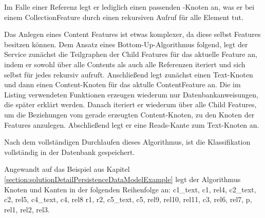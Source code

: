     Im Falle einer Referenz legt er lediglich einen passenden {\resource}-Knoten an,
    was er bei einem CollectionFeature durch einen rekursiven Aufruf für alle Element tut.
    
    Das Anlegen eines Content Features ist etwas komplexer,
    da diese selbst Features besitzen können.
    Dem Ansatz eines Bottom-Up-Algorithmus folgend, legt der Service
    zunächst die Teilgraphen der Child Features für das aktuelle Feature an,
    indem er sowohl über alle Contents als auch alle Referenzen iteriert und
    sich selbst für jedes rekursiv aufruft.
    Anschließend legt zunächst einen Text-Knoten und dann einen Content-Knoten
    für das aktulle ContentFeature an.
    Die im Listing verwendeten Funktionen erzeugen wiederum nur Datenbankanweisungen,
    die später erklärt werden.
    Danach iteriert er wiederum über alle Child Features, um die Beziehungen vom
    gerade erzeugten Content-Knoten, zu den Knoten der Features anzulegen.
    Abschließend legt er eine Reads-Kante zum Text-Knoten an.
    
    Nach dem vollständigen Durchlaufen dieses Algorithmus,
    ist die Klassifikation vollständig in der Datenbank gespeichert.

    Angewandt auf das Beispiel aus Kapitel \ref{section:solutionDetailPersistenceDataModelExample}
    legt der Algorithmus Knoten und Kanten in der folgenden Reihenfolge an:
    c1\_text, c1, rel4,
    c2\_text, c2, rel5,
    c4\_text, c4, rel8
    r1, r2, c5\_text, c5,
    rel9, rel10, rel11,
    c3, rel6, rel7,
    p, rel1, rel2, rel3.